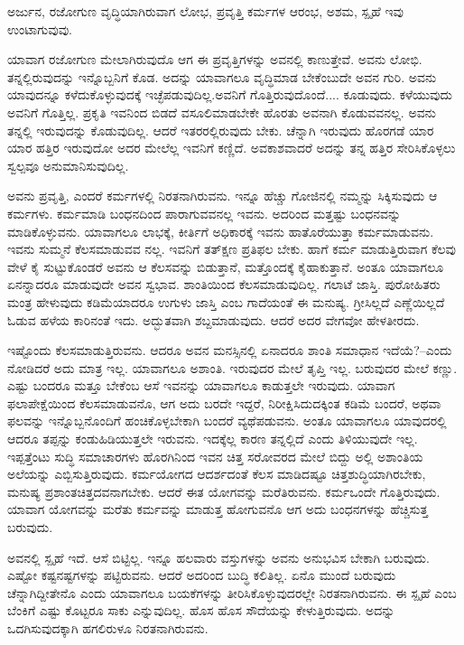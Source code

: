 \begin{artha}
ಅರ್ಜುನ, ರಜೋಗುಣ ವೃದ್ಧಿಯಾಗಿರುವಾಗ ಲೋಭ, ಪ್ರವೃತ್ತಿ ಕರ್ಮಗಳ ಆರಂಭ, ಅಶಮ, ಸ್ಪೃಹೆ ಇವು ಉಂಟಾಗುವುವು.
\end{artha}

ಯಾವಾಗ ರಜೋಗುಣ ಮೇಲಾಗಿರುವುದೊ ಆಗ ಈ ಪ್ರವೃತ್ತಿಗಳನ್ನು ಅವನಲ್ಲಿ ಕಾಣುತ್ತೇವೆ. ಅವನು ಲೋಭಿ. ತನ್ನಲ್ಲಿರುವುದನ್ನು ಇನ್ನೊಬ್ಬನಿಗೆ ಕೊಡ. ಅದನ್ನು ಯಾವಾಗಲೂ ವೃದ್ಧಿಮಾಡ ಬೇಕೆಂಬುದೇ ಅವನ ಗುರಿ. ಅವನು ಯಾವುದನ್ನೂ ಕಳೆದುಕೊಳ್ಳುವುದಕ್ಕೆ ಇಚ್ಛೆಪಡುವುದಿಲ್ಲ.\break ಅವನಿಗೆ ಗೊತ್ತಿರುವುದೊಂದೆ.... ಕೂಡುವುದು. ಕಳೆಯುವುದು ಅವನಿಗೆ ಗೊತ್ತಿಲ್ಲ. ಪ್ರಕೃತಿ ಇವನಿಂದ ಬಿಡದೆ ವಸೂಲಿಮಾಡಬೇಕೇ ಹೊರತು ಅವನಾಗಿ ಕೊಡುವವನಲ್ಲ. ಅವನು ತನ್ನಲ್ಲಿ ಇರುವುದನ್ನು ಕೊಡುವುದಿಲ್ಲ. ಆದರೆ ಇತರರಲ್ಲಿರುವುದು ಬೇಕು. ಚೆನ್ನಾಗಿ ಇರುವುದು ಹೊರಗಡೆ ಯಾರ ಯಾರ ಹತ್ತಿರ ಇರುವುದೋ ಅದರ ಮೇಲೆಲ್ಲ ಇವನಿಗೆ ಕಣ್ಣಿದೆ. ಅವಕಾಶವಾದರೆ ಅದನ್ನು ತನ್ನ ಹತ್ತಿರ ಸೇರಿಸಿಕೊಳ್ಳಲು ಸ್ವಲ್ಪವೂ ಅನುಮಾನಿಸುವುದಿಲ್ಲ.

ಅವನು ಪ್ರವೃತ್ತಿ, ಎಂದರೆ ಕರ್ಮಗಳಲ್ಲಿ ನಿರತನಾಗಿರುವನು. ಇನ್ನೂ ಹೆಚ್ಚು ಗೋಜಿನಲ್ಲಿ ನಮ್ಮನ್ನು ಸಿಕ್ಕಿಸುವುದು ಆ ಕರ್ಮಗಳು. ಕರ್ಮಮಾಡಿ ಬಂಧನದಿಂದ ಪಾರಾಗುವವನಲ್ಲ ಇವನು. ಅದರಿಂದ ಮತ್ತಷ್ಟು ಬಂಧನವನ್ನು ಮಾಡಿಕೊಳ್ಳುವನು. ಯಾವಾಗಲೂ ಲಾಭಕ್ಕೆ, ಕೀರ್ತಿಗೆ ಅಧಿಕಾರಕ್ಕೆ ಇವನು ಹಾತೊರೆಯುತ್ತಾ ಕರ್ಮಮಾಡುವನು. ಇವನು ಸುಮ್ಮನೆ ಕೆಲಸಮಾಡುವವ ನಲ್ಲ. ಇವನಿಗೆ ತತ್​ಕ್ಷಣ ಪ್ರತಿಫಲ ಬೇಕು. ಹಾಗೆ ಕರ್ಮ ಮಾಡುತ್ತಿರುವಾಗ ಕೆಲವು ವೇಳೆ ಕೈ ಸುಟ್ಟುಕೊಂಡರೆ ಅವನು ಆ ಕೆಲಸವನ್ನು ಬಿಡುತ್ತಾನೆ, ಮತ್ತೊಂದಕ್ಕೆ ಕೈಹಾಕುತ್ತಾನೆ. ಅಂತೂ ಯಾವಾಗಲೂ ಏನನ್ನಾದರೂ ಮಾಡುವುದೇ ಅವನ ಸ್ವಭಾವ. ಶಾಂತಿಯಿಂದ ಕೆಲಸಮಾಡುವುದಿಲ್ಲ. ಗಲಾಟೆ ಜಾಸ್ತಿ. ಪುರೋಹಿತರು ಮಂತ್ರ ಹೇಳುವುದು ಕಡಿಮೆಯಾದರೂ ಉಗುಳು ಜಾಸ್ತಿ ಎಂಬ ಗಾದೆಯಂತೆ ಈ ಮನುಷ್ಯ. ಗ್ರೀಸಿಲ್ಲದೆ ಎಣ್ಣೆಯಿಲ್ಲದೆ ಓಡುವ ಹಳೆಯ ಕಾರಿನಂತೆ ಇದು. ಅದ್ಭುತವಾಗಿ ಶಬ್ದಮಾಡುವುದು. ಆದರೆ ಅದರ ವೇಗವೋ ಹೇಳತೀರದು.

ಇಷ್ಟೊಂದು ಕೆಲಸಮಾಡುತ್ತಿರುವನು. ಆದರೂ ಅವನ ಮನಸ್ಸಿನಲ್ಲಿ ಏನಾದರೂ ಶಾಂತಿ ಸಮಾಧಾನ ಇದೆಯೆ?--ಎಂದು ನೋಡಿದರೆ ಅದು ಮಾತ್ರ ಇಲ್ಲ. ಯಾವಾಗಲೂ ಅಶಾಂತಿ. ಇರುವುದರ ಮೇಲೆ ತೃಪ್ತಿ ಇಲ್ಲ. ಬರುವುದರ ಮೇಲೆ ಕಣ್ಣು. ಎಷ್ಟು ಬಂದರೂ ಮತ್ತೂ ಬೇಕೆಂಬ ಆಸೆ ಇವನನ್ನು ಯಾವಾಗಲೂ ಕಾಡುತ್ತಲೇ ಇರುವುದು. ಯಾವಾಗ ಫಲಾಪೇಕ್ಷೆಯಿಂದ ಕೆಲಸಮಾಡುವನೊ, ಆಗ ಅದು ಬರದೇ ಇದ್ದರೆ, ನಿರೀಕ್ಷಿಸಿದುದಕ್ಕಿಂತ ಕಡಿಮೆ ಬಂದರೆ, ಅಥವಾ ಫಲವನ್ನು ಇನ್ನೊಬ್ಬನೊಂದಿಗೆ ಹಂಚಿಕೊಳ್ಳಬೇಕಾಗಿ ಬಂದರೆ ವ್ಯಥೆಪಡುವನು. ಅಂತೂ ಯಾವಾಗಲೂ ಯಾವುದರಲ್ಲಿ ಆದರೂ ತಪ್ಪನ್ನು ಕಂಡುಹಿಡಿಯುತ್ತಲೇ ಇರುವನು. ಇದಕ್ಕೆಲ್ಲ ಕಾರಣ ತನ್ನಲ್ಲಿದೆ ಎಂದು ತಿಳಿಯುವುದೇ ಇಲ್ಲ. ಇಪ್ಪತ್ತೆಂಟು ಸುದ್ಧಿ ಸಮಾಚಾರಗಳು ಹೊರಗಿನಿಂದ ಇವನ ಚಿತ್ತ ಸರೋವರದ ಮೇಲೆ ಬಿದ್ದು ಅಲ್ಲಿ ಅಶಾಂತಿಯ ಅಲೆಯನ್ನು ಎಬ್ಬಿಸುತ್ತಿರುವುದು. ಕರ್ಮಯೋಗದ ಆದರ್ಶದಂತೆ ಕೆಲಸ ಮಾಡಿದಷ್ಟೂ ಚಿತ್ತಶುದ್ಧಿಯಾಗಿರಬೇಕು, ಮನುಷ್ಯ ಪ್ರಶಾಂತಚಿತ್ತದವನಾಗಬೇಕು. ಆದರೆ ಈತ ಯೋಗವನ್ನು ಮರೆತಿರುವನು. ಕರ್ಮಒಂದೇ ಗೊತ್ತಿರುವುದು. ಯಾವಾಗ ಯೋಗವನ್ನು ಮರೆತು ಕರ್ಮವನ್ನು ಮಾಡುತ್ತ ಹೋಗುವನೊ ಆಗ ಅದು ಬಂಧನಗಳನ್ನು ಹೆಚ್ಚಿಸುತ್ತ ಬರುವುದು.

ಅವನಲ್ಲಿ ಸ್ಪೃಹೆ ಇದೆ. ಆಸೆ ಬಿಟ್ಟಿಲ್ಲ. ಇನ್ನೂ ಹಲವಾರು ವಸ್ತುಗಳನ್ನು ಅವನು ಅನುಭವಿಸ ಬೇಕಾಗಿ ಬರುವುದು. ಎಷ್ಟೋ ಕಷ್ಟನಷ್ಟಗಳನ್ನು ಪಟ್ಟಿರುವನು. ಆದರೆ ಅದರಿಂದ ಬುದ್ಧಿ ಕಲಿತಿಲ್ಲ. ಏನೊ ಮುಂದೆ ಬರುವುದು ಚೆನ್ನಾಗಿದ್ದೀತೇನೊ ಎಂದು ಯಾವಾಗಲೂ ಬಯಕೆಗಳನ್ನು ತೀರಿಸಿಕೊಳ್ಳುವುದರಲ್ಲೇ ನಿರತನಾಗಿರುವನು. ಈ ಸ್ಪೃಹೆ ಎಂಬ ಬೆಂಕಿಗೆ ಎಷ್ಟು ಕೊಟ್ಟರೂ ಸಾಕು ಎನ್ನುವುದಿಲ್ಲ. ಹೊಸ ಹೊಸ ಸೌದೆಯನ್ನು ಕೇಳುತ್ತಿರುವುದು. ಅದನ್ನು ಒದಗಿಸುವುದಕ್ಕಾಗಿ ಹಗಲಿರುಳೂ ನಿರತನಾಗಿರುವನು.

